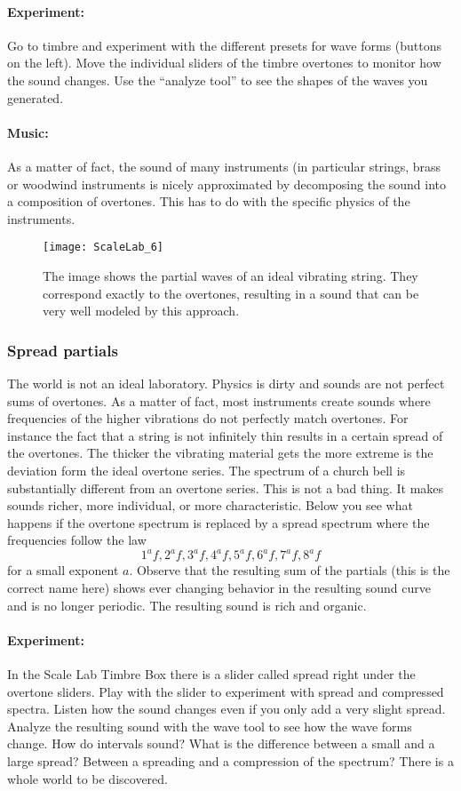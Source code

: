\paragraph{Experiment:}
Go to timbre and experiment with the different presets for wave forms (buttons on the left). Move the individual sliders of the timbre overtones to monitor how the sound changes. Use the ``analyze tool'' to see the shapes of the waves you generated.

\paragraph{Music:}
As a matter of fact, the sound of many instruments (in particular strings, brass or woodwind instruments is nicely approximated by decomposing the sound into a composition of overtones. This has to do with the specific physics of the instruments.

\begin{figure}
\centering
\texttt{[image: ScaleLab\_6]}
\caption*{The image shows the partial waves of an ideal vibrating string. They correspond exactly to the overtones, resulting in a sound that can be very well modeled by this approach.}
\end{figure}


\subsubsection{Spread partials}
The world is not an ideal laboratory. Physics is dirty and sounds are not perfect sums of overtones. As a matter of fact, most instruments create sounds where frequencies of the higher vibrations do not perfectly match overtones. For instance the fact that a string is not infinitely thin results in a certain spread of the overtones. The thicker the vibrating material gets the more extreme is the deviation form the ideal overtone series. The spectrum of a church bell is substantially different from an overtone series. This is not a bad thing. It makes sounds richer, more individual, or more characteristic. Below you see what happens if the overtone spectrum is replaced by a spread spectrum where the frequencies follow the law
$$1^af, 2^af, 3^af, 4^af, 5^af, 6^af, 7^af, 8^af$$
for a small exponent $a$. Observe that the resulting sum of the partials (this is the correct name here) shows ever changing behavior in the resulting sound curve and is no longer periodic. The resulting sound is rich and organic.

\paragraph{Experiment:}
In the  Scale Lab Timbre Box there is a slider called spread right under the overtone sliders. Play with the slider to experiment with spread and compressed spectra. Listen how the sound changes even if you only add a very slight spread. Analyze the resulting sound with the wave tool to see how the wave forms change. How do intervals sound? What is the difference between a small and a large spread? Between a spreading and a compression of the spectrum? There is a whole world to be discovered.


